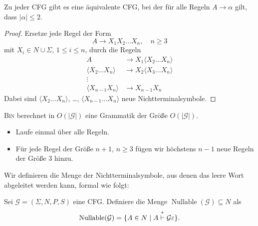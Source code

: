 \begin{lemma}
  Zu jeder \ac{CFG} gibt es eine äquivalente \ac{CFG}, bei der für alle Regeln $A \to \alpha$ gilt, dass $|\alpha| \le 2$.
\end{lemma}
\begin{proof}
  Ersetze jede Regel der Form 
  \begin{displaymath}
    A \to X_1X_2\ldots X_n, \quad n\geq 3
  \end{displaymath}
  mit $X_i \in N \cup \Sigma$, $1 \le i \le n$,
  durch die Regeln 
  \begin{align*}
    A &\to X_1\langle  X_2\ldots X_n \rangle \\
    \langle  X_2\ldots X_n \rangle & \to X_2\langle  X_3\ldots X_n \rangle \\
    \vdots \\
    \langle  X_{n-1}X_n \rangle & \to X_{n-1}X_n
  \end{align*}
  Dabei sind  $\langle  X_2\ldots X_n \rangle$, \ldots, $\langle  X_{n-1}\ldots X_n \rangle$ neue Nichtterminalsymbole.
\end{proof}
\begin{Bemerkung}
\textsc{Bin} berechnet in $O(|\mathcal{G}|)$ eine Grammatik der Größe $O(|\mathcal{G}|)$.
\begin{itemize}
	\item Laufe einmal über alle Regeln.
	
	\item Für jede Regel der Größe $n+1$, $n\geq 3$ fügen wir höchstens $n-1$ neue Regeln der Größe 3 hinzu.
	\qedhere
\end{itemize}
\end{Bemerkung}


Wir definieren die Menge der Nichtterminalsymbole, aus denen das leere Wort abgeleitet werden kann, formal wie folgt:
\begin{Def}
  Sei $\mathcal{G} = (\Sigma, N, P, S)$ eine \ac{CFG}.
  Definiere die Menge $\operatorname{Nullable}(\mathcal{G}) \subseteq N$ als
  \begin{displaymath}
    \operatorname{Nullable}(\mathcal{G}) = \{ A \in N \mid A
    \stackrel{*}{\vdash}\mathcal{G} \varepsilon \}
    \text{.} \qedhere
  \end{displaymath}
\end{Def}

